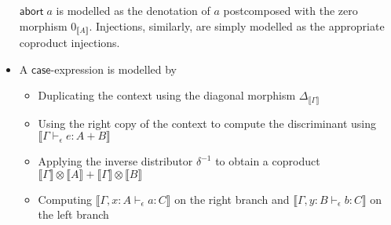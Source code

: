 \documentclass[acmsmall,screen,review]{acmart}
\newcommand{\ms}[1]{\ensuremath{\mathsf{#1}}}
\newcommand{\hasty}[4]{#1 \vdash_{#2} #3: {#4}}
\newcommand{\dnt}[1]{\llbracket{#1}\rrbracket}
\begin{document}
\begin{itemize}
  $\ms{abort}\;a$ is modelled as the denotation of $a$ postcomposed with the zero morphism 
  $0_{\dnt{A}}$. Injections, similarly, are simply modelled as the appropriate coproduct injections.
  \item A \ms{case}-expression is modelled by
  \begin{itemize}
    \item Duplicating the context using the diagonal morphism $\Delta_{\dnt{\Gamma}}$
    \item Using the right copy of the context to compute the discriminant using
          $\dnt{\hasty{\Gamma}{\epsilon}{e}{A + B}}$
    \item Applying the inverse distributor $\delta^{-1}$ to obtain a coproduct
          $\dnt{\Gamma} \otimes \dnt{A} + \dnt{\Gamma} \otimes \dnt{B}$
    \item Computing $\dnt{\hasty{\Gamma, x: A}{\epsilon}{a}{C}}$ on the right
          branch and $\dnt{\hasty{\Gamma, y: B}{\epsilon}{b}{C}}$ on the left branch
  \end{itemize}
\end{itemize}
\end{document}
